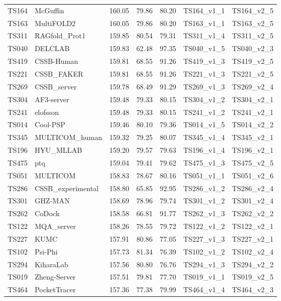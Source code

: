 \begin{longtable}{lllllll}
TS164 & McGuffin & 160.05 & 79.86 & 80.20 & TS164\_v1\_1 & TS164\_v2\_5 \\ 
TS163 & MultiFOLD2 & 160.05 & 79.86 & 80.20 & TS163\_v1\_1 & TS163\_v2\_5 \\ 
TS311 & RAGfold\_Prot1 & 159.85 & 80.54 & 79.31 & TS311\_v1\_4 & TS311\_v2\_5 \\ 
TS040 & DELCLAB & 159.83 & 62.48 & 97.35 & TS040\_v1\_5 & TS040\_v2\_3 \\ 
TS419 & CSSB-Human & 159.81 & 68.55 & 91.26 & TS419\_v1\_3 & TS419\_v2\_5 \\ 
TS221 & CSSB\_FAKER & 159.81 & 68.55 & 91.26 & TS221\_v1\_3 & TS221\_v2\_5 \\ 
TS269 & CSSB\_server & 159.78 & 68.49 & 91.29 & TS269\_v1\_3 & TS269\_v2\_4 \\ 
TS304 & AF3-server & 159.48 & 79.33 & 80.15 & TS304\_v1\_2 & TS304\_v2\_1 \\ 
TS241 & elofsson & 159.48 & 79.33 & 80.15 & TS241\_v1\_2 & TS241\_v2\_1 \\ 
TS014 & Cool-PSP & 159.46 & 80.10 & 79.36 & TS014\_v1\_5 & TS014\_v2\_2 \\ 
TS345 & MULTICOM\_human & 159.32 & 79.25 & 80.07 & TS345\_v1\_4 & TS345\_v2\_1 \\ 
TS196 & HYU\_MLLAB & 159.20 & 79.57 & 79.63 & TS196\_v1\_4 & TS196\_v2\_1 \\ 
TS475 & ptq & 159.04 & 79.41 & 79.62 & TS475\_v1\_3 & TS475\_v2\_5 \\ 
TS051 & MULTICOM & 158.83 & 78.67 & 80.16 & TS051\_v1\_1 & TS051\_v2\_6 \\ 
TS286 & CSSB\_experimental & 158.80 & 65.85 & 92.95 & TS286\_v1\_2 & TS286\_v2\_4 \\ 
TS301 & GHZ-MAN & 158.69 & 78.96 & 79.74 & TS301\_v1\_2 & TS301\_v2\_4 \\ 
TS262 & CoDock & 158.58 & 66.81 & 91.77 & TS262\_v1\_3 & TS262\_v2\_2 \\ 
TS122 & MQA\_server & 158.26 & 78.55 & 79.72 & TS122\_v1\_2 & TS122\_v2\_1 \\ 
TS227 & KUMC & 157.91 & 80.86 & 77.05 & TS227\_v1\_3 & TS227\_v2\_1 \\ 
TS102 & Psi-Phi & 157.73 & 81.34 & 76.39 & TS102\_v1\_2 & TS102\_v2\_4 \\ 
TS294 & KiharaLab & 157.56 & 80.80 & 76.76 & TS294\_v1\_3 & TS294\_v2\_2 \\ 
TS019 & Zheng-Server & 157.51 & 79.81 & 77.70 & TS019\_v1\_1 & TS019\_v2\_5 \\ 
TS464 & PocketTracer & 157.36 & 77.38 & 79.99 & TS464\_v1\_4 & TS464\_v2\_3 \\ 

\end{longtable}
